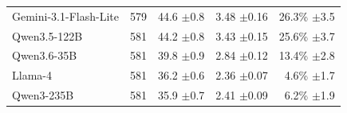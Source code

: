 \begin{table}[t]
\begin{tabular*}{\textwidth}{@{\extracolsep{\fill}}lrrrr@{}}
Gemini-3.1-Flash-Lite & 579 & \shortstack[r]{44.6\\{\scriptsize $\pm$0.8}} & \shortstack[r]{3.48\\{\scriptsize $\pm$0.16}} & \shortstack[r]{26.3\%\\{\scriptsize $\pm$3.5}} \\
Qwen3.5-122B & 581 & \shortstack[r]{44.2\\{\scriptsize $\pm$0.8}} & \shortstack[r]{3.43\\{\scriptsize $\pm$0.15}} & \shortstack[r]{25.6\%\\{\scriptsize $\pm$3.7}} \\
Qwen3.6-35B & 581 & \shortstack[r]{39.8\\{\scriptsize $\pm$0.9}} & \shortstack[r]{2.84\\{\scriptsize $\pm$0.12}} & \shortstack[r]{13.4\%\\{\scriptsize $\pm$2.8}} \\
Llama-4 & 581 & \shortstack[r]{36.2\\{\scriptsize $\pm$0.6}} & \shortstack[r]{2.36\\{\scriptsize $\pm$0.07}} & \shortstack[r]{4.6\%\\{\scriptsize $\pm$1.7}} \\
Qwen3-235B & 581 & \shortstack[r]{35.9\\{\scriptsize $\pm$0.7}} & \shortstack[r]{2.41\\{\scriptsize $\pm$0.09}} & \shortstack[r]{6.2\%\\{\scriptsize $\pm$1.9}} \\
\bottomrule
\end{tabular*}
\end{table}
